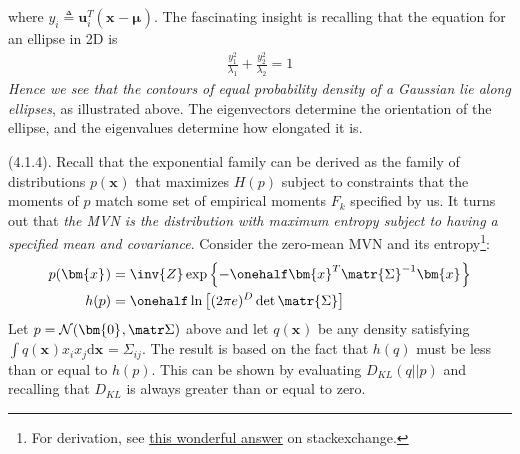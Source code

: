 \documentclass[11pt]{article}
\renewcommand\vec[2][]{\bm{#2}_{#1}}
\newcommand\myspace[1][]{\vspace{#1\bigskipamount}}
\newcommand\p{\Needspace{10\baselineskip} \noindent}
\begin{document}
\myspace{}
where $y_i \triangleq \vec[i]{u}^T (\vec x - \vec\mu)$. The fascinating insight is recalling that the equation for an ellipse in 2D is 
\begin{align}
	\frac{y_1^2}{\lambda_1} + \frac{y_2^2}{\lambda_2} = 1
\end{align}
\textit{Hence we see that the contours of equal probability density of a Gaussian lie along ellipses}, as illustrated above. The eigenvectors determine the orientation of the ellipse, and the eigenvalues determine how elongated it is. 

\myspace
\p {} (4.1.4). Recall that the exponential family can be derived as the family of distributions $p(\vec x)$ that maximizes $H(p)$ subject to constraints that the moments of $p$ match some set of empirical moments $F_k$ specified by us. It turns out that \textit{the MVN is the distribution with maximum entropy subject to having a specified mean and covariance}. Consider the zero-mean MVN and its entropy\footnote{For derivation, see \href{https://math.stackexchange.com/a/650281}{this wonderful answer} on stackexchange.}:
\begin{align}
	p(\vec x)
		&= \inv{Z} \exp\left\{ - \onehalf \vec{x}^T \matr{\Sigma}^{-1} \vec x  \right\} \\
	h(p)
		&= \onehalf \ln \left[  (2\pi e)^D \det \matr{\Sigma}   \right]
\end{align}
Let $p = \mathcal{N}(\vec 0, \matr \Sigma)$ above and let $q(\vec x)$ be any density satisfying $\int q(\vec x) x_i x_j \mathrm{d}\vec x = \Sigma_{ij}$. The result is based on the fact that $h(q)$ must be less than or equal to $h(p)$. This can be shown by evaluating $D_{KL}(q || p)$ and recalling that $D_{KL}$ is always greater than or equal to zero. 
\end{document}

